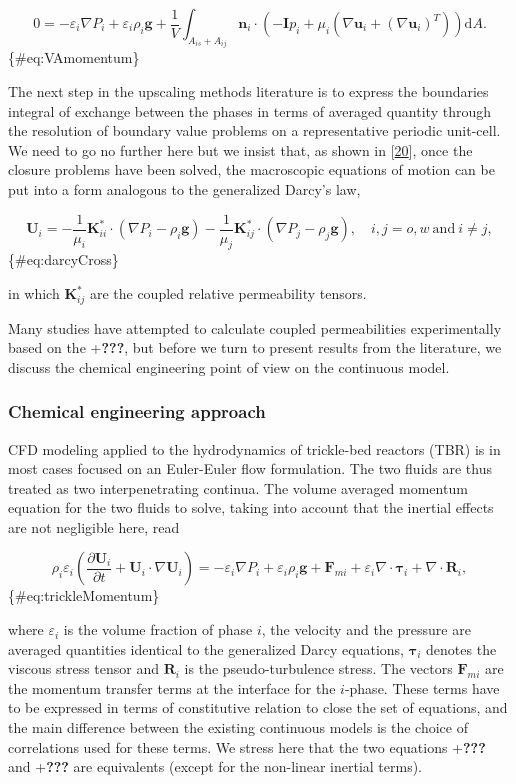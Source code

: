 \documentclass[]{article}
\begin{document}
\[
0=-\varepsilon_{i}\nabla P_{i}+\varepsilon_{i}\rho_{i}\mathbf{g}+\frac{1}{V}\int_{A_{is}+A_{ij}}\mathbf{n}_{i}\cdot\left(-\mathbf{I}p_{i}+\mu_{i}\left(\nabla\mathbf{u}_{i}+\left(\nabla\mathbf{u}_{i}\right)^{T}\right)\right)\mathrm{d}A.
\] \{\#eq:VAmomentum\}

The next step in the upscaling methods literature is to express the
boundaries integral of exchange between the phases in terms of averaged
quantity through the resolution of boundary value problems on a
representative periodic unit-cell. We need to go no further here but we
insist that, as shown in {[}\protect\hyperlink{ref-Lasseux1996}{20}{]},
once the closure problems have been solved, the macroscopic equations of
motion can be put into a form analogous to the generalized Darcy's law,

\[
\mathbf{U}_{i}=-\frac{1}{\mu_{i}}\mathbf{K}_{ii}^{*}\cdot(\nabla P_{i}-\rho_{i}\mathbf{g})-\frac{1}{\mu_{j}}\mathbf{K}_{ij}^{*}\cdot(\nabla P_{j}-\rho_{j}\mathbf{g}),\quad i,j=o,w\:\mathrm{and}\:i\neq j,
\] \{\#eq:darcyCross\}

in which \(\mathbf{K}_{ij}^{*}\) are the coupled relative permeability
tensors.

Many studies have attempted to calculate coupled permeabilities
experimentally based on the +\textbf{???}, but before we turn to present
results from the literature, we discuss the chemical engineering point
of view on the continuous model.

\hypertarget{chemical-engineering-approach}{%
\subsubsection{Chemical engineering
approach}\label{chemical-engineering-approach}}

CFD modeling applied to the hydrodynamics of trickle-bed reactors (TBR)
is in most cases focused on an Euler-Euler flow formulation. The two
fluids are thus treated as two interpenetrating continua. The volume
averaged momentum equation for the two fluids to solve, taking into
account that the inertial effects are not negligible here, read

\[
\rho_{i}\varepsilon_{i}\left(\frac{\partial\mathbf{U}_{i}}{\partial t}+\mathbf{U}_{i}\cdot\nabla\mathbf{U}_{i}\right)=-\varepsilon_{i}\nabla P_{i}+\varepsilon_{i}\rho_{i}\mathbf{g}+\mathbf{F}_{mi}+\varepsilon_{i}\nabla\cdot\boldsymbol{\tau}_{i}+\nabla\cdot\mathbf{R}_{i},
\] \{\#eq:trickleMomentum\}

where \(\varepsilon_{i}\) is the volume fraction of phase \(i\), the
velocity and the pressure are averaged quantities identical to the
generalized Darcy equations, \(\boldsymbol{\tau}_{i}\) denotes the
viscous stress tensor and \(\mathbf{R}_{i}\) is the pseudo-turbulence
stress. The vectors \(\mathbf{F}_{mi}\) are the momentum transfer terms
at the interface for the \(i\)-phase. These terms have to be expressed
in terms of constitutive relation to close the set of equations, and the
main difference between the existing continuous models is the choice of
correlations used for these terms. We stress here that the two equations
+\textbf{???} and +\textbf{???} are equivalents (except for the
non-linear inertial terms).
\end{document}
